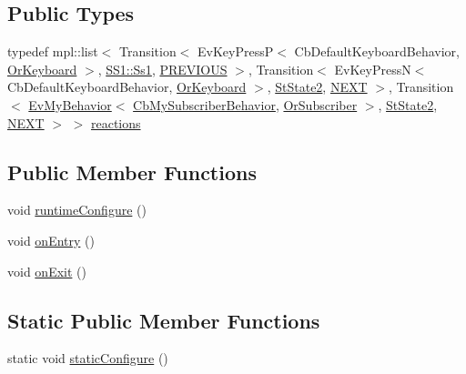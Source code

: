 \subsection*{Public Types}
\begin{DoxyCompactItemize}
\item 
typedef mpl\+::list$<$ Transition$<$ Ev\+Key\+PressP$<$ Cb\+Default\+Keyboard\+Behavior, \hyperlink{classsm__ferrari_1_1OrKeyboard}{Or\+Keyboard} $>$, \hyperlink{structsm__ferrari_1_1SS1_1_1Ss1}{S\+S1\+::\+Ss1}, \hyperlink{structsm__ferrari_1_1StState1_1_1PREVIOUS}{P\+R\+E\+V\+I\+O\+US} $>$, Transition$<$ Ev\+Key\+PressN$<$ Cb\+Default\+Keyboard\+Behavior, \hyperlink{classsm__ferrari_1_1OrKeyboard}{Or\+Keyboard} $>$, \hyperlink{structsm__ferrari_1_1StState2}{St\+State2}, \hyperlink{structsm__ferrari_1_1StState1_1_1NEXT}{N\+E\+XT} $>$, Transition$<$ \hyperlink{structsm__ferrari_1_1cl__subscriber_1_1EvMyBehavior}{Ev\+My\+Behavior}$<$ \hyperlink{classsm__ferrari_1_1cl__subscriber_1_1CbMySubscriberBehavior}{Cb\+My\+Subscriber\+Behavior}, \hyperlink{classsm__ferrari_1_1OrSubscriber}{Or\+Subscriber} $>$, \hyperlink{structsm__ferrari_1_1StState2}{St\+State2}, \hyperlink{structsm__ferrari_1_1StState1_1_1NEXT}{N\+E\+XT} $>$ $>$ \hyperlink{structsm__ferrari_1_1StState1_a274606ddafaf6bfbc62c424474b8d515}{reactions}
\end{DoxyCompactItemize}
\subsection*{Public Member Functions}
\begin{DoxyCompactItemize}
\item 
void \hyperlink{structsm__ferrari_1_1StState1_a8c04e573f6fb8c93d09153ab56d608a0}{runtime\+Configure} ()
\item 
void \hyperlink{structsm__ferrari_1_1StState1_a1b52a499d3ba8d68bfd50a076a97f085}{on\+Entry} ()
\item 
void \hyperlink{structsm__ferrari_1_1StState1_a1ad97c02d538952ea0f4657540e25d1b}{on\+Exit} ()
\end{DoxyCompactItemize}
\subsection*{Static Public Member Functions}
\begin{DoxyCompactItemize}
\item 
static void \hyperlink{structsm__ferrari_1_1StState1_a9b9203b9ef7001c90e76bbc687baae43}{static\+Configure} ()
\end{DoxyCompactItemize}
